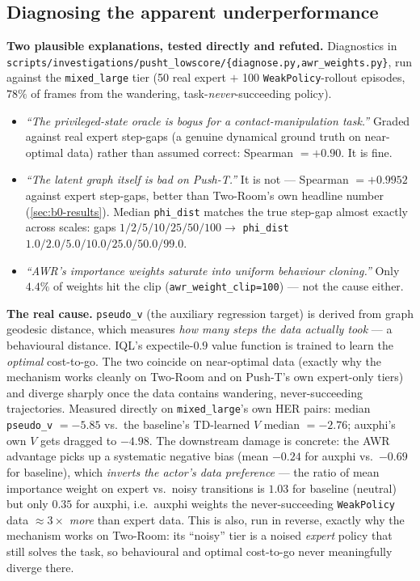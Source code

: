 \documentclass[11pt]{article}
\begin{document}
\subsection{Diagnosing the apparent underperformance}
\label{sec:b5-underperf-diagnosis}

\textbf{Two plausible explanations, tested directly and refuted.} Diagnostics in
\texttt{scripts/investigations/pusht\_lowscore/\{diagnose.py,awr\_weights.py\}}, run against the
\texttt{mixed\_large} tier (50 real expert $+$ 100 \texttt{WeakPolicy}-rollout episodes, $78\%$
of frames from the wandering, task-\emph{never}-succeeding policy).
\begin{itemize}[leftmargin=1.4em,itemsep=2pt]
\item \emph{``The privileged-state oracle is bogus for a contact-manipulation task.''} Graded
against real expert step-gaps (a genuine dynamical ground truth on near-optimal data) rather
than assumed correct: Spearman $=+0.90$. It is fine.
\item \emph{``The latent graph itself is bad on Push-T.''} It is not --- Spearman
$=\mathbf{+0.9952}$ against expert step-gaps, better than Two-Room's own headline number
(\cref{sec:b0-results}). Median \texttt{phi\_dist} matches the true step-gap almost exactly
across scales: gaps $1/2/5/10/25/50/100 \to$ \texttt{phi\_dist} $1.0/2.0/5.0/10.0/25.0/50.0/99.0$.
\item \emph{``AWR's importance weights saturate into uniform behaviour cloning.''} Only $4.4\%$
of weights hit the clip (\texttt{awr\_weight\_clip=100}) --- not the cause either.
\end{itemize}

\textbf{The real cause.} \texttt{pseudo\_v} (the auxiliary regression target) is derived from
graph geodesic distance, which measures \emph{how many steps the data actually took} --- a
behavioural distance. IQL's expectile-$0.9$ value function is trained to learn the
\emph{optimal} cost-to-go. The two coincide on near-optimal data (exactly why the mechanism
works cleanly on Two-Room and on Push-T's own expert-only tiers) and diverge sharply once the
data contains wandering, never-succeeding trajectories. Measured directly on
\texttt{mixed\_large}'s own HER pairs: median \texttt{pseudo\_v} $=-5.85$ vs.\ the baseline's
TD-learned $V$ median $=-2.76$; auxphi's own $V$ gets dragged to $-4.98$. The downstream damage
is concrete: the AWR advantage picks up a systematic negative bias (mean $-0.24$ for auxphi vs.\
$-0.69$ for baseline), which \emph{inverts the actor's data preference} --- the ratio of mean
importance weight on expert vs.\ noisy transitions is $1.03$ for baseline (neutral) but only
$\mathbf{0.35}$ for auxphi, i.e.\ auxphi weights the never-succeeding \texttt{WeakPolicy} data
$\approx 3\times$ \emph{more} than expert data. This is also, run in reverse, exactly why the
mechanism works on Two-Room: its ``noisy'' tier is a noised \emph{expert} policy that still
solves the task, so behavioural and optimal cost-to-go never meaningfully diverge there.
\end{document}
